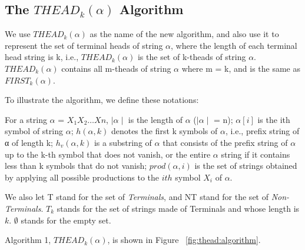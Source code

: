 \documentclass{sig-alternate-05-2015}
\begin{document}
\subsection{The $THEAD_k(\alpha)$ Algorithm}
We use $THEAD_k(\alpha)$ as the name of the new algorithm, and
also use it to represent the set of terminal heads of string $\alpha$,
where the length of each terminal head string is k, i.e.,
$THEAD_k(\alpha)$ is the set of k-theads of string $\alpha$. $THEAD_k(\alpha)$
contains all m-theads of string $\alpha$ where m = k, and is the
same as $FIRST_k(\alpha)$.

To illustrate the algorithm, we define these notations:

For a string $\alpha$ = $X_1X_2 \ldots Xn$, $\mid \alpha \mid$ is the length of $\alpha$ ($\mid \alpha \mid$ = n);
$\alpha[i]$ is the ith symbol of string $\alpha$; $h(\alpha, k)$ denotes the first k
symbols of $\alpha$, i.e., prefix string of α of length k; $h_v(\alpha, k)$ is a
substring of $\alpha$ that consists of the prefix string of $\alpha$ up to
the k-th symbol that does not vanish, or the entire $\alpha$ string if
it contains less than k symbols that do not vanish; $prod(\alpha, i)$
is the set of strings obtained by applying all possible productions
to the $ith$ symbol $X_i$ of $\alpha$.

We also let T stand for the set of \textit{Terminals}, and NT
stand for the set of \textit{Non-Terminals}. $T_k$ stands for the set of
strings made of Terminals and whose length is $k$. $\emptyset$ stands
for the empty set.

Algorithm 1, $THEAD_k(\alpha)$, is shown in Figure ~\ref{fig:thead:algorithm}.
\end{document}
